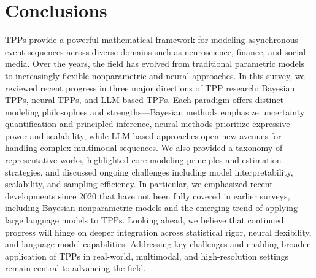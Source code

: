 \documentclass[10pt]{article} %
\begin{document}






\section{Conclusions}
TPPs provide a powerful mathematical framework for modeling asynchronous event sequences across diverse domains such as neuroscience, finance, and social media. Over the years, the field has evolved from traditional parametric models to increasingly flexible nonparametric and neural approaches. In this survey, we reviewed recent progress in three major directions of TPP research: Bayesian TPPs, neural TPPs, and LLM-based TPPs. Each paradigm offers distinct modeling philosophies and strengths—Bayesian methods emphasize uncertainty quantification and principled inference, neural methods prioritize expressive power and scalability, while LLM-based approaches open new avenues for handling complex multimodal sequences.
We also provided a taxonomy of representative works, highlighted core modeling principles and estimation strategies, and discussed ongoing challenges including model interpretability, scalability, and sampling efficiency. In particular, we emphasized recent developments since 2020 that have not been fully covered in earlier surveys, including Bayesian nonparametric models and the emerging trend of applying large language models to TPPs.
Looking ahead, we believe that continued progress will hinge on deeper integration across statistical rigor, neural flexibility, and language-model capabilities. Addressing key challenges and enabling broader application of TPPs in real-world, multimodal, and high-resolution settings remain central to advancing the field. 
\end{document}
